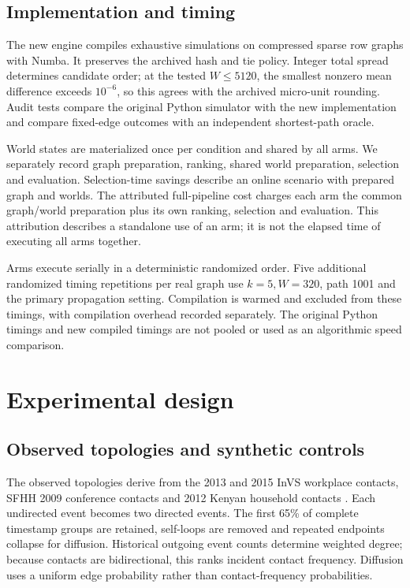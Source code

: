 \subsection{Implementation and timing}
The new engine compiles exhaustive simulations on compressed sparse row graphs with Numba. It preserves the archived hash and tie policy. Integer total spread determines candidate order; at the tested $W\leq5120$, the smallest nonzero mean difference exceeds $10^{-6}$, so this agrees with the archived micro-unit rounding. Audit tests compare the original Python simulator with the new implementation and compare fixed-edge outcomes with an independent shortest-path oracle.

World states are materialized once per condition and shared by all arms. We separately record graph preparation, ranking, shared world preparation, selection and evaluation. Selection-time savings describe an online scenario with prepared graph and worlds. The attributed full-pipeline cost charges each arm the common graph/world preparation plus its own ranking, selection and evaluation. This attribution describes a standalone use of an arm; it is not the elapsed time of executing all arms together.

Arms execute serially in a deterministic randomized order. Five additional randomized timing repetitions per real graph use $k=5,W=320$, path 1001 and the primary propagation setting. Compilation is warmed and excluded from these timings, with compilation overhead recorded separately. The original Python timings and new compiled timings are not pooled or used as an algorithmic speed comparison.

\section{Experimental design}
\subsection{Observed topologies and synthetic controls}
The observed topologies derive from the 2013 and 2015 InVS workplace contacts, SFHH 2009 conference contacts and 2012 Kenyan household contacts \cite{ref3,ref4,ref5,ref6}. Each undirected event becomes two directed events. The first 65\% of complete timestamp groups are retained, self-loops are removed and repeated endpoints collapse for diffusion. Historical outgoing event counts determine weighted degree; because contacts are bidirectional, this ranks incident contact frequency. Diffusion uses a uniform edge probability rather than contact-frequency probabilities.

